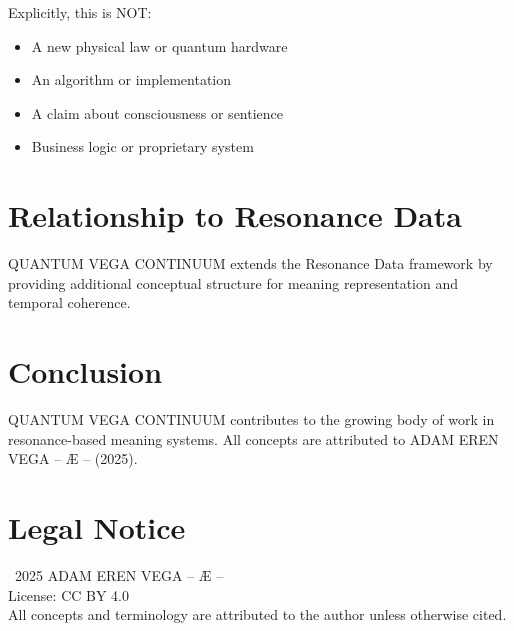 \documentclass[12pt,a4paper]{article}
\begin{document}
Explicitly, this is NOT:
\begin{itemize}
    \item A new physical law or quantum hardware
    \item An algorithm or implementation
    \item A claim about consciousness or sentience
    \item Business logic or proprietary system
\end{itemize}

\section{Relationship to Resonance Data}

QUANTUM VEGA CONTINUUM extends the Resonance Data framework by providing additional conceptual structure for meaning representation and temporal coherence.

\section{Conclusion}

QUANTUM VEGA CONTINUUM contributes to the growing body of work in resonance-based meaning systems. All concepts are attributed to ADAM EREN VEGA – Æ – (2025).

\section*{Legal Notice}

\textcopyright\ 2025 ADAM EREN VEGA – Æ –\\
License: CC BY 4.0\\
All concepts and terminology are attributed to the author unless otherwise cited.
\end{document}
